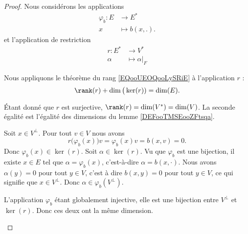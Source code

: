 \begin{proof}
	Nous considérons les applications
	\begin{equation}
		\begin{aligned}
			\varphi_b\colon E & \to E^*         \\
			x                 & \mapsto b(x,.).
		\end{aligned}
	\end{equation}
	et l'application de restriction
	\begin{equation}
		\begin{aligned}
			r\colon E^* & \to V^*           \\
			\alpha      & \mapsto \alpha|_F
		\end{aligned}
	\end{equation}

	\begin{subproof}
		Nous appliquons le théorème du rang \ref{EQooUEOQooLySRiE} à l'application \( r\) :
		\begin{equation}		\label{EQooSABBooUdWyZL}
			\rank(r)+\dim\big(\ker(r))=\dim(E).
		\end{equation}

		\spitem[\( \rank(r)=\dim(V)\)]

		Étant donné que \( r\) est surjective, \(\rank(r)=\dim(V^*)=\dim(V)\). La seconde égalité est l'égalité des dimensions du lemme \ref{DEFooTMSEooZFtsqa}.

		Soit \( x\in V^{\perp}\). Pour tout \( v\in V\) nous avons
		\begin{equation}
			r\big(\varphi_b(x))v=\varphi_b(x)v=b(x,v)=0.
		\end{equation}
		Donc \( \varphi_b(x)\in\ker(r)\).
		Soit \( \alpha\in \ker(r)\). Vu que \( \varphi_b\) est une bijection, il existe \( x\in E\) tel que \( \alpha=\varphi_b(x)\), c'est-à-dire \( \alpha=b(x,\cdot)\). Nous avons \( \alpha(y)=0\) pour tout \( y\in V\), c'est à dire \( b(x,y)=0\) pour tout \( y\in V\), ce qui signifie que \( x\in V^{\perp}\). Donc \( \alpha\in \varphi_b(V^{\perp})\).

		\spitem[\( \dim(V^{\perp})=\dim\big(\ker(r)\big)\)]
		L'application \( \varphi_b\) étant globalement injective, elle est une bijection entre \( V^{\perp}\) et \( \ker(r)\). Donc ces deux ont la même dimension.


\end{subproof}
\end{proof}
